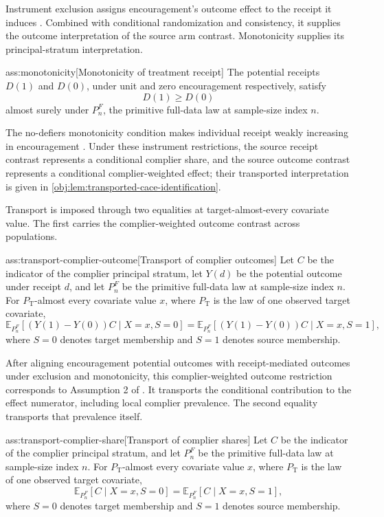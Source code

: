 Instrument exclusion assigns encouragement's outcome effect to the receipt it induces \citep{ChenHuang2025Generalizing}. Combined with conditional randomization and consistency, it supplies the outcome interpretation of the source arm contrast. Monotonicity supplies its principal-stratum interpretation.

\begin{assumptionv}{ass:monotonicity}[Monotonicity of treatment receipt]
The potential receipts \(D(1)\) and \(D(0)\), under unit and zero encouragement respectively, satisfy
\[
D(1)\ge D(0)
\]
almost surely under \(P_n^F\), the primitive full-data law at sample-size index \(n\).
\end{assumptionv}

The no-defiers monotonicity condition makes individual receipt weakly increasing in encouragement \citep{ChenHuang2025Generalizing}. Under these instrument restrictions, the source receipt contrast represents a conditional complier share, and the source outcome contrast represents a conditional complier-weighted effect; their transported interpretation is given in \cref{obj:lem:transported-cace-identification}.

Transport is imposed through two equalities at target-almost-every covariate value. The first carries the complier-weighted outcome contrast across populations.

\begin{assumptionv}{ass:transport-complier-outcome}[Transport of complier outcomes]
Let \(C\) be the indicator of the complier principal stratum, let \(Y(d)\) be the potential outcome under receipt \(d\), and let \(P_n^F\) be the primitive full-data law at sample-size index \(n\). For \(P_{\mathrm T}\)-almost every covariate value \(x\), where \(P_{\mathrm T}\) is the law of one observed target covariate,
\[
\mathbb E_{P_n^F}[(Y(1)-Y(0))C\mid X=x,S=0]
=
\mathbb E_{P_n^F}[(Y(1)-Y(0))C\mid X=x,S=1],
\]
where \(S=0\) denotes target membership and \(S=1\) denotes source membership.
\end{assumptionv}

After aligning encouragement potential outcomes with receipt-mediated outcomes under exclusion and monotonicity, this complier-weighted outcome restriction corresponds to Assumption 2 of \citet{ChenHuang2025Generalizing}. It transports the conditional contribution to the effect numerator, including local complier prevalence. The second equality transports that prevalence itself.

\begin{assumptionv}{ass:transport-complier-share}[Transport of complier shares]
Let \(C\) be the indicator of the complier principal stratum, and let \(P_n^F\) be the primitive full-data law at sample-size index \(n\). For \(P_{\mathrm T}\)-almost every covariate value \(x\), where \(P_{\mathrm T}\) is the law of one observed target covariate,
\[
\mathbb E_{P_n^F}[C\mid X=x,S=0]
=
\mathbb E_{P_n^F}[C\mid X=x,S=1],
\]
where \(S=0\) denotes target membership and \(S=1\) denotes source membership.
\end{assumptionv}

